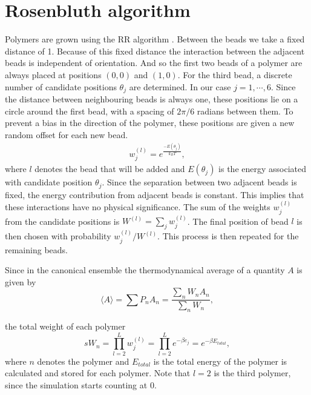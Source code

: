 \section{Rosenbluth algorithm}
Polymers are grown using the RR algorithm \cite{rosenbluth1955monte}. Between the beads we take a fixed distance of 1. Because of this fixed distance the interaction between the adjacent beads is independent of orientation. And so the first two beads of a polymer are always placed at positions $(0,0)$ and $(1,0)$. For the third bead, a discrete number of candidate positions $\theta_j$ are determined. In our case $j=1,\cdots,6$. Since the distance between neighbouring beads is always one, these positions lie on a circle around the first bead, with a spacing of $2\pi/6$ radians between them. To prevent a bias in the direction of the polymer, these positions are given a new random offset for each new bead.
\begin{gather}
    w_j^{(l)} = e^\frac{-E(\theta_j)}{k_BT},
\end{gather} where $l$ denotes the bead that will be added and $E(\theta_j)$ is the energy associated with candidate position $\theta_j$. Since the separation between two adjacent beads is fixed, the energy contribution from adjacent beads is constant. This implies that these interactions have no physical significance. The sum of the weights $w_j^{(l)}$ from the candidate positions is $W^{(l)} = \sum_j w_j^{(l)}$. The final position of bead $l$ is then chosen with probability $w_j^{(l)}/W^{(l)}$. This process is then repeated for the remaining beads.

Since in the canonical ensemble the thermodynamical average of a quantity $A$ is given by
\begin{equation}
\langle A \rangle = \sum P_nA_n = \frac{\sum_n W_n A_n}{\sum_n W_n},
\end{equation}

the total weight of each polymer
\begin{equation}\label{eq:polymer_weight}s
    W_n = \prod_{l=2}^L w_j^{(l)} = \prod_{l=2}^Le^{-\beta e_j} = e^{-\beta E_{total}},
\end{equation} where $n$ denotes the polymer and $E_{total}$ is the total energy of the polymer is calculated and stored for each polymer.  Note that $l=2$ is the third polymer, since the simulation starts counting at $0$.